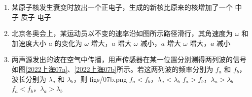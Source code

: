 \documentclass[\gkver]{gaokaozhenti}
\begin{document}
\begin{enumerate}
{水温升高时，乒乓球内气体的温度随之升高，气体分子的平均动能增大，分子热运动加剧。球内气体的体积近似不变，由查理定律 $\frac{p}{T} = C$ 可知，温度升高时压强变大。

故选 A。
}

\item
某原子核发生衰变时放出一个正电子，生成的新核比原来的核增加了一个
{中子}
{质子}
{电子}

\item
北京冬奥会上，某运动员以不变的速率沿如图所示路径滑行，其角速度为 $\omega$ 和加速度大小 $a$ 的变化为
\onepicture[w=2.6cm]{}
{$\omega$ 增大，$a$ 增大}
{$\omega$ 减小，$a$ 增大}
{$\omega$ 增大，$a$ 减小}

\item
两声源发出的波在空气中传播，用声传感器在某一位置分别测得两列波的信号如图\ref{2022上海07a}、\ref{2022上海07b}所示。若这两列波的频率分别为 $f_{a}$ 和 $f_{b}$，波长分别为 $\lambda_{a}$ 和 $\lambda_{b}$，则
{figs/07b.png}
{$f_{a} < f_{b}$，$\lambda_{a} < \lambda_{b}$}
{$f_{a} > f_{b}$，$\lambda_{a} > \lambda_{b}$}
{$f_{a} < f_{b}$，$\lambda_{a} > \lambda_{b}$}
\end{enumerate}
\end{document}
